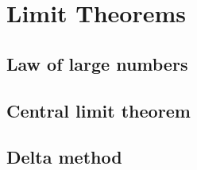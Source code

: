 
\section{Limit Theorems}

\subsection{Law of large numbers}


\subsection{Central limit theorem}


\subsection{Delta method}

